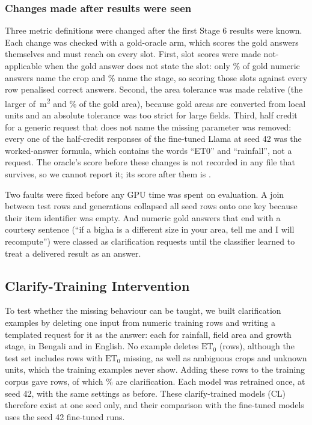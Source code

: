 \subsubsection*{Changes made after results were seen}

Three metric definitions were changed after the first Stage 6 results were known. Each change was checked with a gold-oracle arm, which scores the gold answers themselves and must reach \ChangeOracleAfter on every slot. First, slot scores were made not-applicable when the gold answer does not state the slot: only \ChangeCropCeilingPct\% of gold numeric answers name the crop and \ChangeStageCeilingPct\% name the stage, so scoring those slots against every row penalised correct answers. Second, the area tolerance was made relative (the larger of \TolAreaAbs\,m\textsuperscript{2} and \TolAreaRelPct\% of the gold area), because gold areas are converted from local units and an absolute tolerance was too strict for large fields. Third, half credit for a generic request that does not name the missing parameter was removed: every one of the \ChangeNamedNoAskPartials half-credit responses of the fine-tuned Llama at seed 42 was the worked-answer formula, which contains the words ``ET0'' and ``rainfall'', not a request. The oracle's score before these changes is not recorded in any file that survives, so we cannot report it; its score after them is \ChangeOracleAfter.

Two faults were fixed before any GPU time was spent on evaluation. A join between test rows and generations collapsed all \JoinBugCollapsed seed rows onto one key because their item identifier was empty. And \ChangeBighaGolds numeric gold answers that end with a courtesy sentence (``if a bigha is a different size in your area, tell me and I will recompute'') were classed as clarification requests until the classifier learned to treat a delivered result as an answer.

\subsection{Clarify-Training Intervention}
\label{sec:impl-clarify}

To test whether the missing behaviour can be taught, we built \ClarifyTrainRows clarification examples by deleting one input from numeric training rows and writing a templated request for it as the answer: \ClarifyTrainSlotRain each for rainfall, field area and growth stage, \ClarifyTrainBn in Bengali and \ClarifyTrainEn in English. No example deletes $\mathrm{ET}_0$ (\ClarifyTrainSlotEt rows), although the test set includes rows with $\mathrm{ET}_0$ missing, as well as ambiguous crops and unknown units, which the training examples never show. Adding these rows to the training corpus gave \ClarifyCorpusRows rows, of which \ClarifyCorpusPctClarify\% are clarification. Each model was retrained once, at seed 42, with the same settings as before. These clarify-trained models (CL) therefore exist at one seed only, and their comparison with the fine-tuned models uses the seed 42 fine-tuned runs.

